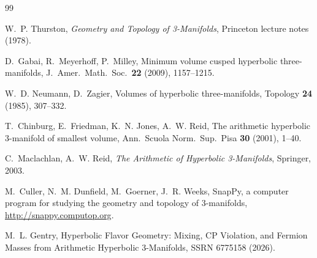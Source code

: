 \documentclass[11pt,a4paper]{article}
\theoremstyle{definition}
\begin{document}
\begin{thebibliography}{99}

W.~P. Thurston,
\emph{Geometry and Topology of 3-Manifolds},
Princeton lecture notes (1978).

D.~Gabai, R.~Meyerhoff, P.~Milley,
Minimum volume cusped hyperbolic three-manifolds,
J.\ Amer.\ Math.\ Soc.\ \textbf{22} (2009), 1157--1215.

W.~D. Neumann, D.~Zagier,
Volumes of hyperbolic three-manifolds,
Topology \textbf{24} (1985), 307--332.

T.~Chinburg, E.~Friedman, K.~N. Jones, A.~W. Reid,
The arithmetic hyperbolic 3-manifold of smallest volume,
Ann.\ Scuola Norm.\ Sup.\ Pisa \textbf{30} (2001), 1--40.

C.~Maclachlan, A.~W. Reid,
\emph{The Arithmetic of Hyperbolic 3-Manifolds},
Springer, 2003.

M.~Culler, N.~M. Dunfield, M.~Goerner, J.~R. Weeks,
SnapPy, a computer program for studying the geometry and topology
of 3-manifolds,
\url{http://snappy.computop.org}.

M.~L. Gentry,
Hyperbolic Flavor Geometry: Mixing, CP Violation, and Fermion Masses
from Arithmetic Hyperbolic 3-Manifolds,
SSRN 6775158 (2026).

\end{thebibliography}
\end{document}
